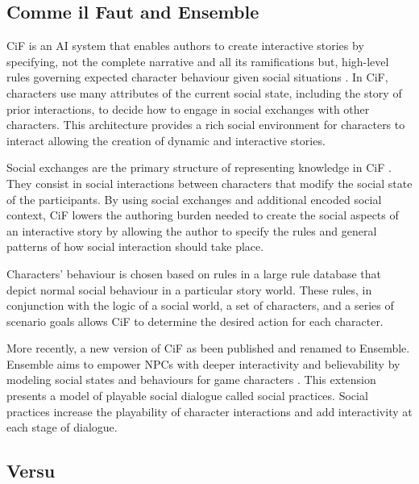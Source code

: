 \subsection{Comme il Faut and Ensemble}
\label{subsection:cif}
\noindent \ac{CiF} is an \ac{AI} system that enables authors to create interactive stories by specifying, not the complete narrative and all its ramifications but, high-level rules governing expected character behaviour given social situations \cite{mccoy:cif-social-story-worlds}.
In \ac{CiF}, characters use many attributes of the current social state, including the story of prior interactions, to decide how to engage in social exchanges with other characters.
This architecture provides a rich social environment for characters to interact allowing the creation of dynamic and interactive stories.

Social exchanges are the primary structure of representing knowledge in \ac{CiF} \cite{mccoy:cif-authoring}.
They consist in social interactions between characters that modify the social state of the participants.
By using social exchanges and additional encoded social context, \ac{CiF} lowers the authoring burden needed to create the social aspects of an interactive story by allowing the author to specify the rules and general patterns of how social interaction should take place.

Characters' behaviour is chosen based on rules in a large rule database that depict normal social behaviour in a particular story world.
These rules, in conjunction with the logic of a social world, a set of characters, and a series of scenario goals allows \ac{CiF} to determine the desired action for each character.

More recently, a new version of \ac{CiF} as been published and renamed to Ensemble.
Ensemble aims to empower \acp{NPC} with deeper interactivity and believability by modeling social states and behaviours for game characters \cite{treanor:ensemble}.
This extension presents a model of playable social dialogue called social practices.
Social practices increase the playability of character interactions and add interactivity at each stage of dialogue.

\subsection{Versu}
\label{subsection:versu}

